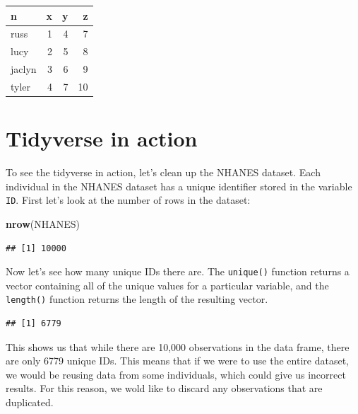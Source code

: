 \documentclass[
  12pt,
]{book}
\newenvironment{Shaded}{\begin{snugshade}}{\end{snugshade}}
\newcommand{\FunctionTok}[1]{\textcolor[rgb]{0.13,0.29,0.53}{\textbf{#1}}}
\newcommand{\NormalTok}[1]{#1}
\newcommand{\SpecialCharTok}[1]{\textcolor[rgb]{0.81,0.36,0.00}{\textbf{#1}}}
\begin{document}
\begin{tabular}{l|r|r|r}
\hline
n & x & y & z\\
\hline
russ & 1 & 4 & 7\\
\hline
lucy & 2 & 5 & 8\\
\hline
jaclyn & 3 & 6 & 9\\
\hline
tyler & 4 & 7 & 10\\
\hline
\end{tabular}

\hypertarget{tidyverse-in-action}{%
\section{Tidyverse in action}\label{tidyverse-in-action}}

To see the tidyverse in action, let's clean up the NHANES dataset. Each individual in the NHANES dataset has a unique identifier stored in the variable \texttt{ID}. First let's look at the number of rows in the dataset:

\begin{Shaded}
\begin{Highlighting}[]
\FunctionTok{nrow}\NormalTok{(NHANES)}
\end{Highlighting}
\end{Shaded}

\begin{verbatim}
## [1] 10000
\end{verbatim}

Now let's see how many unique IDs there are. The \texttt{unique()} function returns a vector containing all of the unique values for a particular variable, and the \texttt{length()} function returns the length of the resulting vector.

\begin{Shaded}
\end{Shaded}

\begin{verbatim}
## [1] 6779
\end{verbatim}

This shows us that while there are 10,000 observations in the data frame, there are only 6779 unique IDs. This means that if we were to use the entire dataset, we would be reusing data from some individuals, which could give us incorrect results. For this reason, we wold like to discard any observations that are duplicated.
\end{document}
